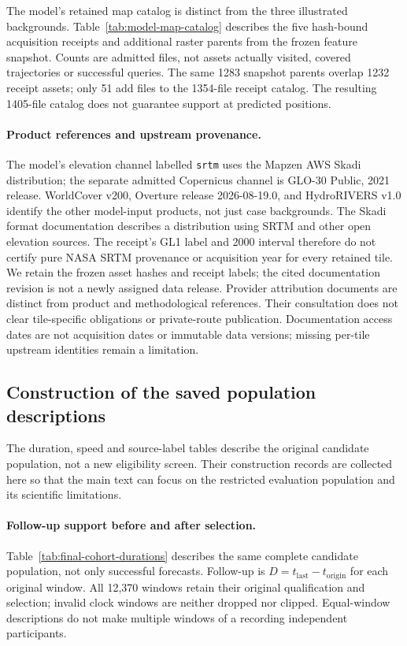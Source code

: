 \documentclass[11pt]{article}
\begin{document}
The model's retained map catalog is distinct from the three illustrated
backgrounds. Table~\ref{tab:model-map-catalog} describes the five hash-bound
acquisition receipts and additional raster parents from the frozen feature
snapshot. Counts are admitted files, not assets actually visited, covered
trajectories or successful queries. The same 1283 snapshot parents overlap
1232 receipt assets; only 51 add files to the 1354-file receipt catalog.
The resulting 1405-file catalog does not guarantee support at predicted positions.

\paragraph{Product references and upstream provenance.}
The model's elevation channel labelled \texttt{srtm} uses the Mapzen AWS
Skadi distribution\cite{mapzenterrain}; the separate admitted Copernicus
channel is GLO-30 Public, 2021 release\cite{copernicusdem2021}.
WorldCover v200\cite{worldcover2021}, Overture release
2026-08-19.0\cite{overture202608}, and HydroRIVERS v1.0\cite{hydrorivers2013,hydroriverslicense}
identify the other model-input products, not just case backgrounds.
The Skadi format documentation describes a distribution using SRTM and
other open elevation sources. The receipt's GL1 label and 2000 interval
therefore do not certify pure NASA SRTM provenance or acquisition year for
every retained tile. We retain the frozen asset hashes and receipt labels;
the cited documentation revision is not a newly assigned data release.
Provider attribution documents\cite{mapzenattribution,overtureattribution,hydroriverslicense}
are distinct from product and methodological references. Their consultation
does not clear tile-specific obligations or private-route publication.
Documentation access dates are not acquisition dates or immutable data
versions; missing per-tile upstream identities remain a limitation.

\subsection{Construction of the saved population descriptions}
\label{sec:population-description-construction}
The duration, speed and source-label tables describe the original candidate
population, not a new eligibility screen. Their construction records are
collected here so that the main text can focus on the restricted evaluation
population and its scientific limitations.

\paragraph{Follow-up support before and after selection.}\label{sec:final-cohort-durations}
Table~\ref{tab:final-cohort-durations} describes the same complete candidate
population, not only successful forecasts. Follow-up is
$D=t_{\mathrm{last}}-t_{\mathrm{origin}}$ for each original window.
All 12,370 windows retain their original qualification and selection;
invalid clock windows are neither dropped nor clipped. Equal-window
descriptions do not make multiple windows of a recording independent participants.
\end{document}
